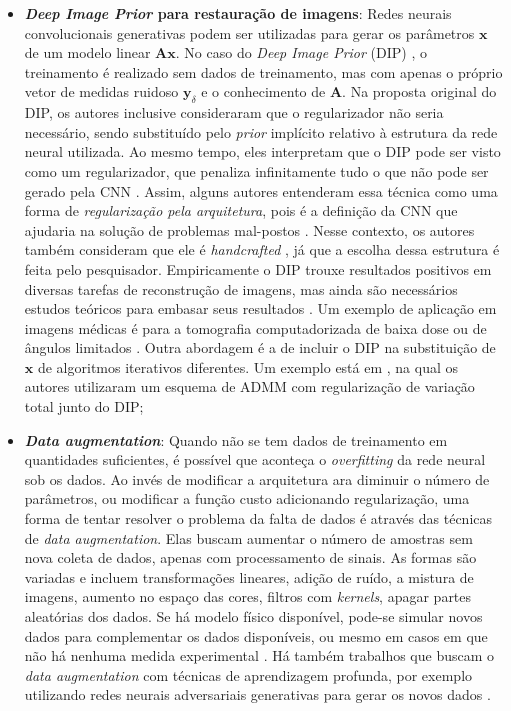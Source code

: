\begin{itemize}
\item \textbf{\textit{Deep Image Prior} para restauração de imagens}: Redes neurais convolucionais generativas podem ser utilizadas para gerar os parâmetros $\mathbf{x}$ de um modelo linear $\mathbf{A}\mathbf{x}$. No caso do \textit{Deep Image Prior} (DIP) \cite{Ulyanov2020}, o treinamento é realizado sem dados de treinamento, mas com apenas o próprio vetor de medidas ruidoso $\mathbf{y}_{\delta}$ e o conhecimento de $\mathbf{A}$. Na proposta original do DIP, os autores inclusive consideraram que o regularizador não seria necessário, sendo substituído pelo \textit{prior} implícito relativo à estrutura da rede neural utilizada. Ao mesmo tempo, eles interpretam que o DIP pode ser visto como um regularizador, que penaliza infinitamente tudo o que não pode ser gerado pela CNN \cite{Ulyanov2020}. Assim, alguns autores entenderam essa técnica como uma forma de \textit{regularização pela arquitetura}, pois é a definição da CNN que ajudaria na solução de problemas mal-postos \cite{Dittmer2019}. Nesse contexto, os autores também consideram que ele é \textit{handcrafted} \cite{Ulyanov2020}, já que a escolha dessa estrutura é feita pelo pesquisador. Empiricamente o DIP trouxe resultados positivos em diversas tarefas de reconstrução de imagens, mas ainda são necessários estudos teóricos para embasar seus resultados \cite{Belthangady2019, Feng2020, Liu2019}. Um exemplo de aplicação em imagens médicas é para a tomografia computadorizada de baixa dose ou de ângulos limitados \cite{Baguer2020, Barutcu2021}. Outra abordagem é a de incluir o DIP na substituição de $\mathbf{x}$ de algoritmos iterativos diferentes. Um  exemplo está em \cite{Cascarano2021}, na qual os autores utilizaram um esquema de ADMM com regularização de variação total junto do DIP;


\item \textbf{\textit{Data augmentation}}: Quando não se tem dados de treinamento em quantidades suficientes, é possível que aconteça o \textit{overfitting} da rede neural sob os dados. Ao invés de modificar a arquitetura ara diminuir o número de parâmetros, ou modificar a função custo adicionando regularização, uma forma de tentar resolver o problema da falta de dados é através das técnicas de \textit{data augmentation}. Elas buscam aumentar o número de amostras sem nova coleta de dados, apenas com processamento de sinais. As formas são variadas e incluem transformações lineares, adição de ruído, a mistura de imagens, aumento no espaço das cores, filtros com \textit{kernels}, apagar partes aleatórias dos dados. Se há modelo físico disponível, pode-se simular novos dados para complementar os dados disponíveis, ou mesmo em casos em que não há nenhuma medida experimental \cite[pág. 6]{inman2005damage}. Há também trabalhos que buscam o \textit{data augmentation} com técnicas de aprendizagem profunda, por exemplo utilizando redes neurais adversariais generativas para gerar os novos dados \cite{Liu2020, Shorten2019}.  


\end{itemize}
